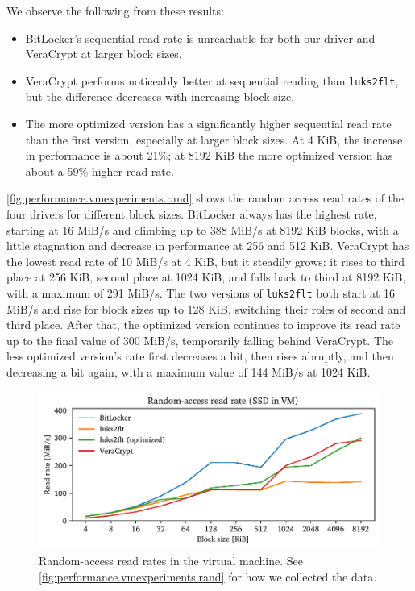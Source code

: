 We observe the following from these results:
\begin{itemize}
	\item BitLocker's sequential read rate is unreachable for both our driver and VeraCrypt at larger block sizes. 
	\item VeraCrypt performs noticeably better at sequential reading than \texttt{luks2flt}, but the difference decreases with increasing block size. 
	\item The more optimized version has a significantly higher sequential read rate than the first version, especially at larger block sizes. At 4 KiB, the increase in performance is about 21\%; at 8192 KiB the more optimized version has about a 59\% higher read rate.
\end{itemize}

\autoref{fig:performance.vmexperiments.rand} shows the random access read rates of the four drivers for different block sizes. BitLocker always has the highest rate, starting at 16 MiB/s and climbing up to 388 MiB/s at 8192 KiB blocks, with a little stagnation and decrease in performance at 256 and 512 KiB. VeraCrypt has the lowest read rate of 10 MiB/s at 4 KiB, but it steadily grows: it rises to third place at 256 KiB, second place at 1024 KiB, and falls back to third at 8192 KiB, with a maximum of 291 MiB/s. The two versions of \texttt{luks2flt} both start at 16 MiB/s and rise for block sizes up to 128 KiB, switching their roles of second and third place. After that, the optimized version continues to improve its read rate up to the final value of 300 MiB/s, temporarily falling behind VeraCrypt. The less optimized version's rate first decreases a bit, then rises abruptly, and then decreasing a bit again, with a maximum value of 144 MiB/s at 1024 KiB.

\begin{figure}[htb!]
	\center
	\includegraphics[scale=1]{../fig/performance.vmexperiments.rand.pdf}
	\caption[
		Random-access read rates in the virtual machine
	]{
		Random-access read rates in the virtual machine. See \autoref{fig:performance.vmexperiments.rand} for how we collected the data.
	}
	\label{fig:performance.vmexperiments.rand}
\end{figure}

